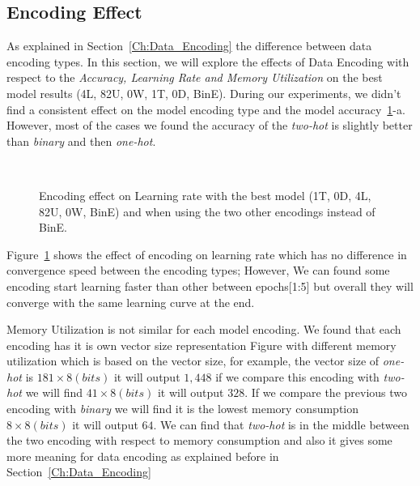 \subsection{Encoding Effect}

As explained in Section~\ref{Ch:Data_Encoding} the difference between data encoding types. In this section, we will explore the effects of Data Encoding with respect to the \textit{Accuracy, Learning Rate and Memory Utilization} on the best model results (4L, 82U, 0W, 1T, 0D, BinE). During our experiments, we didn't find a consistent effect on the model encoding type and the model accuracy~\ref{Fig:Convergence_Memory}-a. However, most of the cases we found the accuracy of the \textit{two-hot} is slightly better than \textit{binary} and then \textit{one-hot}.


\begin{figure}[!t]
  \centering
  \begin{tikzpicture}
    
  \end{tikzpicture}
  \caption{Encoding effect on Learning rate with the best model (1T, 0D, 4L, 82U, 0W, BinE) and when using the two other encodings instead of BinE.}~\label{Fig:Convergence_Memory}%
\end{figure}


Figure~\ref{Fig:Convergence_Memory} shows the effect of encoding on learning rate which has no difference in convergence speed between the encoding types; However, We can found some encoding start learning faster than other between epochs[1:5] but overall they will converge with the same learning curve at the end.


Memory Utilization is not similar for each model encoding. We found that each encoding has it is own vector size representation Figure with different memory utilization which is based on the vector size, for example, the vector size of \textit{\textit{one-hot}} is $181 \times 8(bits)$ it will output $1,448$ if we compare this encoding with \textit{\textit{two-hot}} we will find $41 \times 8(bits)$ it will output $328$. If we compare the previous two encoding with \textit{\textit{binary}} we will find it is the lowest memory consumption $8 \times 8(bits)$ it will output $64$. We can find that \textit{\textit{two-hot}} is in the middle between the two encoding with respect to memory consumption and also it gives some more meaning for data encoding as explained before in Section~\ref{Ch:Data_Encoding}

